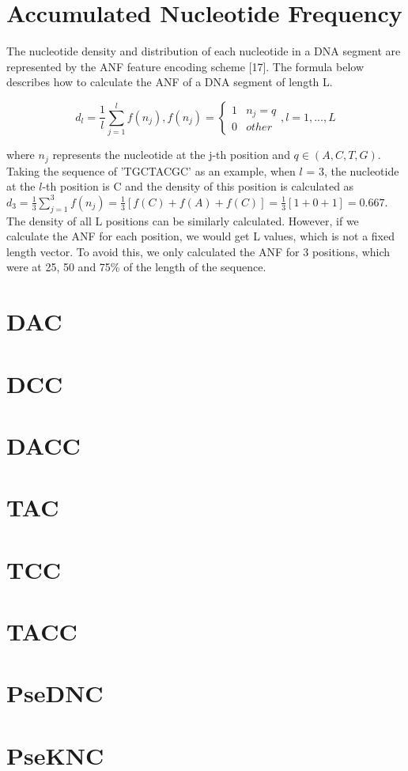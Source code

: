\section{Accumulated Nucleotide Frequency}

The nucleotide density and distribution of each nucleotide in a \gls{DNA} segment are represented by the \gls{ANF} feature encoding scheme [17]. The formula below describes how to calculate the \gls{ANF} of a \gls{DNA} segment of length L.

\begin{equation}\label{eq:K-mer}
    d_{l} = \frac{1}{l}\sum_{j=1}^{l}f(n_{j}), f(n_{j}) = \begin{cases}1 & n_{j} = q\\0 & other\end{cases}, l = 1,...,L
\end{equation}

where $n_{j}$ represents the nucleotide at the j-th position and $q \in (A,C,T,G)$. Taking the sequence of 'TGCTACGC' as an example, when $l$ = 3, the nucleotide at the $l$-th position is C and the density of this position is calculated as $d_{3} = \frac{1}{3}\sum_{j=1}^{3}f(n_{j}) = \frac{1}{3} [f(C) + f(A) + f(C)] = \frac{1}{3} [1+0+1] = 0.667$. The density of all L positions can be similarly calculated. However, if we calculate the ANF for each position, we would get L values, which is not a fixed length vector. To avoid this, we only calculated the ANF for 3 positions, which were at 25, 50 and 75\% of the length of the sequence.

\section{DAC}
\section{DCC}
\section{DACC}
\section{TAC}
\section{TCC}
\section{TACC}
\section{PseDNC}
\section{PseKNC}